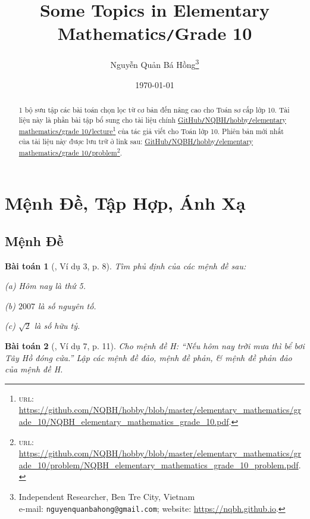 \documentclass{article}
\title{Some Topics in Elementary Mathematics\texttt{/}Grade 10}
\author{Nguyễn Quản Bá Hồng\footnote{Independent Researcher, Ben Tre City, Vietnam\\e-mail: \texttt{nguyenquanbahong@gmail.com}; website: \url{https://nqbh.github.io}.}}
\date{\today}
\numberwithin{equation}{section}
\newtheorem{baitoan}{Bài toán}[section]
\begin{document}
\maketitle
\begin{abstract}
	1 bộ sưu tập các bài toán chọn lọc từ cơ bản đến nâng cao cho Toán sơ cấp lớp 10. Tài liệu này là phần bài tập bổ sung cho tài liệu chính \href{https://github.com/NQBH/hobby/blob/master/elementary_mathematics/grade_10/NQBH_elementary_mathematics_grade_10.pdf}{GitHub\texttt{/}NQBH\texttt{/}hobby\texttt{/}elementary mathematics\texttt{/}grade 10\texttt{/}lecture}\footnote{\textsc{url}: \url{https://github.com/NQBH/hobby/blob/master/elementary_mathematics/grade_10/NQBH_elementary_mathematics_grade_10.pdf}.} của tác giả viết cho Toán lớp 10. Phiên bản mới nhất của tài liệu này được lưu trữ ở link sau: \href{https://github.com/NQBH/hobby/blob/master/elementary_mathematics/grade_10/problem/NQBH_elementary_mathematics_grade_10_problem.pdf}{GitHub\texttt{/}NQBH\texttt{/}hobby\texttt{/}elementary mathematics\texttt{/}grade 10\texttt{/}problem}\footnote{\textsc{url}: \url{https://github.com/NQBH/hobby/blob/master/elementary_mathematics/grade_10/problem/NQBH_elementary_mathematics_grade_10_problem.pdf}.}.
\end{abstract}
\tableofcontents
\newpage


\section{Mệnh Đề, Tập Hợp, Ánh Xạ}

\subsection{Mệnh Đề}

\begin{baitoan}[\cite{TL_chuyen_Toan_Dai_So_10}, Ví dụ 3, p. 8]
	Tìm phủ định của các mệnh đề sau:
	\begin{enumerate*}
		\item[(a)] Hôm nay là thứ 5.
		\item[(b)] $2007$ là số nguyên tố.
		\item[(c)] $\sqrt{2}$ là số hữu tỷ.
	\end{enumerate*}
\end{baitoan}

\begin{baitoan}[\cite{TL_chuyen_Toan_Dai_So_10}, Ví dụ 7, p. 11]
	Cho mệnh đề H: ``Nếu hôm nay trời mưa thì bể bơi Tây Hồ đóng cửa.'' Lập các mệnh đề đảo, mệnh đề phản, \& mệnh đề phản đảo của mệnh đề H.
\end{baitoan}
\end{document}
